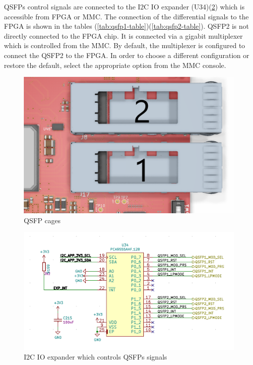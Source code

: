 \documentclass[12pt,oneside,a4]{article}
\begin{document}
QSFPs control signals are connected to the I2C IO expander (U34)(\ref{qsfpio}) which is accessible from FPGA or MMC. The connection of the differential signals to the FPGA is shown in the tables (\ref{tab:qsfp1-table})(\ref{tab:qsfp2-table}). QSFP2 is not directly connected to the FPGA chip. It is connected via a gigabit multiplexer which is controlled from the MMC. By default, the multiplexer is configured to connect the QSFP2 to the FPGA. In order to choose a different configuration or restore the default, select the appropriate option from the MMC console.

\begin{figure}[H]
\begin{center}
\includegraphics[width=0.8\linewidth]{qsfp.png}
 \caption{QSFP cages}\label{qsfp}
\end{center}
\end{figure}

\begin{figure}[H]
\begin{center}
\includegraphics[width=0.8\linewidth]{qsfpio.png}
 \caption{I2C IO expander which controls QSFPs signals}\label{qsfpio}
\end{center}
\end{figure}
\end{document}
